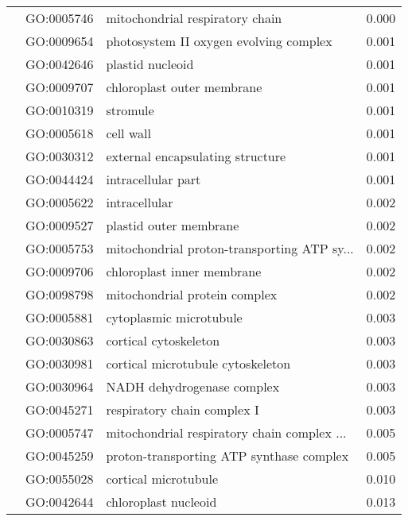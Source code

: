 \begin{longtable}{lllr}
   & GO:0005746 &              mitochondrial respiratory chain &         0.000 \\
   & GO:0009654 &       photosystem II oxygen evolving complex &         0.001 \\
   & GO:0042646 &                             plastid nucleoid &         0.001 \\
   & GO:0009707 &                   chloroplast outer membrane &         0.001 \\
   & GO:0010319 &                                     stromule &         0.001 \\
   & GO:0005618 &                                    cell wall &         0.001 \\
   & GO:0030312 &             external encapsulating structure &         0.001 \\
   & GO:0044424 &                           intracellular part &         0.001 \\
   & GO:0005622 &                                intracellular &         0.002 \\
   & GO:0009527 &                       plastid outer membrane &         0.002 \\
   & GO:0005753 &  mitochondrial proton-transporting ATP sy... &         0.002 \\
   & GO:0009706 &                   chloroplast inner membrane &         0.002 \\
   & GO:0098798 &                mitochondrial protein complex &         0.002 \\
   & GO:0005881 &                      cytoplasmic microtubule &         0.003 \\
   & GO:0030863 &                        cortical cytoskeleton &         0.003 \\
   & GO:0030981 &            cortical microtubule cytoskeleton &         0.003 \\
   & GO:0030964 &                   NADH dehydrogenase complex &         0.003 \\
   & GO:0045271 &                  respiratory chain complex I &         0.003 \\
   & GO:0005747 &  mitochondrial respiratory chain complex ... &         0.005 \\
   & GO:0045259 &     proton-transporting ATP synthase complex &         0.005 \\
   & GO:0055028 &                         cortical microtubule &         0.010 \\
   & GO:0042644 &                         chloroplast nucleoid &         0.013 \\

\end{longtable}
